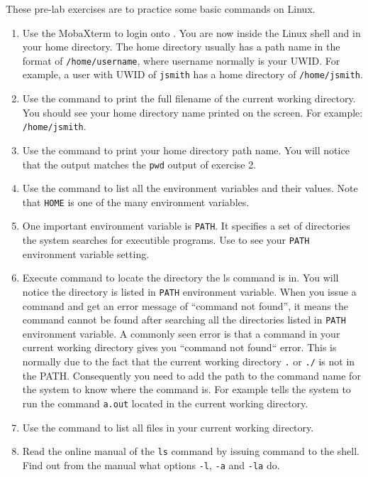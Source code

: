 These pre-lab exercises are to practice some basic commands on Linux. 
\begin{enumerate}
    \item Use the MobaXterm to login onto
      . You are now inside the Linux shell and in your home directory. The home directory usually has a path name in the format of \verb+/home/username+, where username normally is your UWID. For example, a user with UWID of \verb+jsmith+ has a home directory of \verb+/home/jsmith+.
    \item Use the  command to print the full filename of the current working directory. You should see your home directory name printed on the screen. For example: \verb+/home/jsmith+.
    \item Use the  command to print your home directory path name. You will notice that the output matches the \verb+pwd+ output of exercise 2.
    \item Use the  command to list all the environment variables and their values. Note that \verb+HOME+ is one of the many environment variables.
    \item One important environment variable is \verb+PATH+. It specifies a set of directories the system searches for executible programs. Use  to see your \verb+PATH+ environment variable setting.
    \item Execute command  to locate the directory the ls command is in. You will notice the directory is listed in \verb+PATH+ environment variable. When you issue a command and get an error message of ``command not found'', it means the command cannot be found after searching all the directories listed in \verb+PATH+ environment variable. A commonly seen error is that a command in your current working directory gives you ``command not found`` error. This is normally due to the fact that the current working directory \verb+.+ or \verb+./+ is not in the PATH. Consequently you need to add the path to the command name for the system to know where the command is. For example  tells the system to run the command \verb+a.out+ located in the current working directory. 
    \item Use the  command to list all files in your current working
          directory. 
    \item Read the online manual of the \verb+ls+ command by issuing 
       command to the shell.
      Find out from the manual what options \verb+-l+, \verb+-a+ and \verb+-la+ do.

\end{enumerate}
